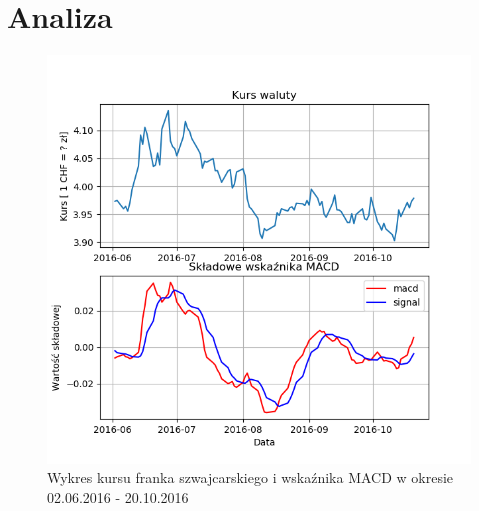 \documentclass{article} %
\begin{document}
\newpage

\section{Analiza}

\begin{figure}[h]
    \centering
    \includegraphics[scale=0.7]{images/wykres_bez_ulepszenia.png}
    \caption{Wykres kursu franka szwajcarskiego i wskaźnika MACD w okresie 02.06.2016 - 20.10.2016}
\end{figure}
\end{document}
